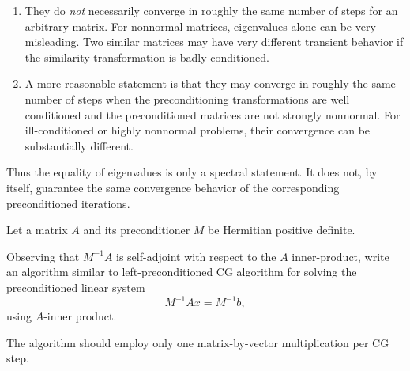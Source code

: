 \documentclass{ctexart}
\begin{document}
\begin{solution}
\begin{enumerate}[label=(\alph*)]
    \item They do \emph{not} necessarily converge in roughly the same number of
      steps for an arbitrary matrix.  For nonnormal matrices, eigenvalues alone can
      be very misleading.  Two similar matrices may have very different transient
      behavior if the similarity transformation is badly conditioned.

    \item A more reasonable statement is that they may converge in roughly the
      same number of steps when the preconditioning transformations are well
      conditioned and the preconditioned matrices are not strongly nonnormal.
      For ill-conditioned or highly nonnormal problems, their convergence can be
      substantially different.
  \end{enumerate}

  Thus the equality of eigenvalues is only a spectral statement.  It does not,
  by itself, guarantee the same convergence behavior of the corresponding
  preconditioned iterations.
\end{solution}
\begin{problem}\label{pro:6}
  Let a matrix $A$ and its preconditioner $M$ be Hermitian positive definite.

  Observing that $M^{-1}A$ is self-adjoint with respect to the $A$ inner-product, write an algorithm similar to left-preconditioned CG algorithm for solving the preconditioned linear system
  \[
    M^{-1}Ax=M^{-1}b,
  \]
  using $A$-inner product.

  The algorithm should employ only one matrix-by-vector multiplication per CG step.
\end{problem}
\end{document}
